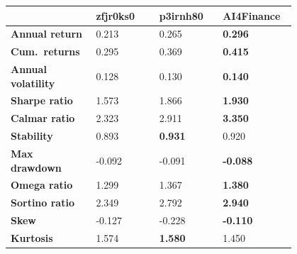 \documentclass[../xlapes02]{subfiles}
\begin{document}
    \begin{table}[H]
        \centering
        {\footnotesize
            \begin{tabular}{*{4}{|m{0.20\linewidth}|}}
                \toprule
                & \bfseries zfjr0ks0                   & \bfseries p3irnh80                    & \bfseries AI4Finance \\[0.2cm]
                \midrule
                \bfseries Annual return       & 0.213                                & 0.265                                 & \color[HTML]{00F000} \bfseries 0.296 \\[0.2cm]
                \bfseries Cum.\ returns       & 0.295                                & 0.369                                 & \color[HTML]{00F000} \bfseries 0.415 \\[0.2cm]
                \bfseries Annual volatility   & 0.128                                & 0.130                                 & \color[HTML]{00F000} \bfseries 0.140 \\[0.2cm]
                \bfseries Sharpe ratio        & 1.573                                & 1.866                                 & \color[HTML]{00F000} \bfseries 1.930 \\[0.2cm]
                \bfseries Calmar ratio        & 2.323                                & 2.911                                 & \color[HTML]{00F000} \bfseries 3.350 \\[0.2cm]
                \bfseries Stability           & 0.893                                & \color[HTML]{00F000} \bfseries 0.931  & 0.920 \\[0.2cm]
                \bfseries Max drawdown        & -0.092                               & -0.091                                & \color[HTML]{00F000} \bfseries -0.088 \\[0.2cm]
                \bfseries Omega ratio         & 1.299                                & 1.367                                 & \color[HTML]{00F000} \bfseries 1.380 \\[0.2cm]
                \bfseries Sortino ratio       & 2.349                                & 2.792                                 & \color[HTML]{00F000} \bfseries 2.940 \\[0.2cm]
                \bfseries Skew                & -0.127                               & -0.228                                & \color[HTML]{00F000} \bfseries -0.110 \\[0.2cm]
                \bfseries Kurtosis            & 1.574                                & \color[HTML]{00F000} \bfseries 1.580  & 1.450 \\[0.2cm]

\end{tabular}}
\end{table}
\end{document}
